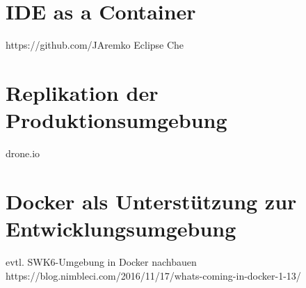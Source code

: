\section{IDE as a Container}
\label{sec:ideasacontainer}
https://github.com/JAremko
Eclipse Che
\section{Replikation der Produktionsumgebung}
\label{sec:replikation-produktionsumgebung}
drone.io
\section{Docker als Unterstützung zur Entwicklungsumgebung}
\label{sec:docker-assistance}
evtl. SWK6-Umgebung in Docker nachbauen %
https://blog.nimbleci.com/2016/11/17/whats-coming-in-docker-1-13/





